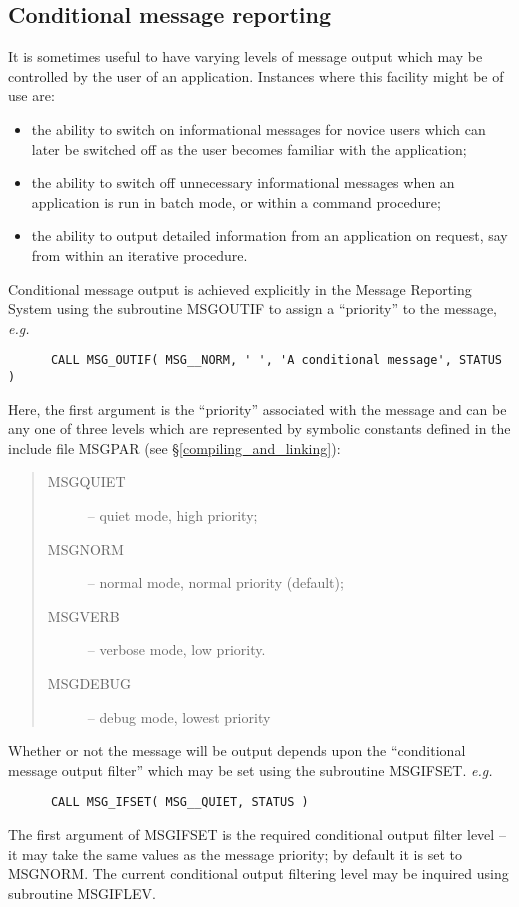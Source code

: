 \documentclass[twoside,11pt]{article}
\newcommand{\htmlref}[2]{#1}
\newcommand{\latex}[1]{#1}
\newcommand{\xlabel}[1]{}
\renewcommand{\_}{\texttt{\symbol{95}}}
\begin{document}
\subsection{\xlabel{conditional_message_reporting}Conditional message reporting}
It is sometimes useful to have varying levels of message output which 
may be controlled by the user of an application.
Instances where this facility might be of use are:
\begin {itemize}
\item the ability to switch on informational messages for novice users
which can later be switched off as the user becomes familiar with 
the application;
\item the ability to switch off unnecessary informational messages when
an application is run in batch mode, or within a command procedure;
\item the ability to output detailed information from an application on 
request, say from within an iterative procedure.
\end {itemize}
Conditional message output is achieved explicitly in the Message Reporting
System using the subroutine MSG\_OUTIF to assign a ``priority'' to the
message, \textit{e.g.}
\begin {small}
\begin{verbatim}
      CALL MSG_OUTIF( MSG__NORM, ' ', 'A conditional message', STATUS )
\end{verbatim}
\end {small}
Here, the first argument is the ``priority'' associated with the 
message and can be any one of three levels which are 
represented by symbolic constants defined in the include file 
\htmlref
{MSG\_PAR}{compiling_and_linking}\latex{ (see \S\ref{compiling_and_linking})}:
\begin {quote}
\begin {description}
\item [MSG\_\_QUIET] -- quiet mode, high priority;
\item [MSG\_\_NORM] -- normal mode, normal priority (default);
\item [MSG\_\_VERB] -- verbose mode, low priority.
\item [MSG\_\_DEBUG] -- debug mode, lowest priority
\end {description}
\end {quote}
Whether or not the message will be output depends upon the ``conditional
message output filter'' which may be set using the subroutine MSG\_IFSET.
\textit{e.g.}
\begin {small}
\begin{verbatim}
      CALL MSG_IFSET( MSG__QUIET, STATUS )
\end{verbatim}
\end {small}
The first argument of MSG\_IFSET is the required conditional output filter
level -- it may take the same values as the message priority; by default it
is set to MSG\_\_NORM.
The current conditional output filtering level may be inquired using
subroutine MSG\_IFLEV.
\end{document}
